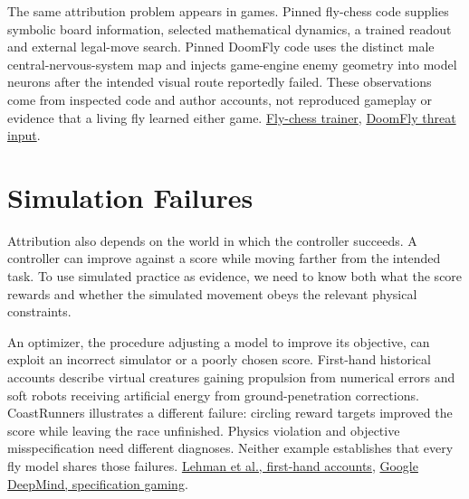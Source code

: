 The same attribution problem appears in games. Pinned fly-chess code supplies symbolic board information, selected mathematical dynamics, a trained readout and external legal-move search. Pinned DoomFly code uses the distinct male central-nervous-system map and injects game-engine enemy geometry into model neurons after the intended visual route reportedly failed. These observations come from inspected code and author accounts, not reproduced gameplay or evidence that a living fly learned either game. \href{https://github.com/mncrftfrcnm/making-fly-play-chess/blob/b97dfefbf9b8850f3cdf6b412c2ed840be94e260/scripts/fly_chess_trainer.py}{Fly-chess trainer}, \href{https://github.com/shreyash-sharma/doomFly/blob/5f6c2881be5f5f40b0592a75e6ee231b50333b40/src/doom/fearless/danger.py}{DoomFly threat input}.\par

\section{Simulation Failures}

Attribution also depends on the world in which the controller succeeds. A
controller can improve against a score while moving farther from the intended
task. To use simulated practice as evidence, we need to know both what the
score rewards and whether the simulated movement obeys the relevant
physical constraints.\par

An optimizer, the procedure adjusting a model to improve its objective, can exploit an incorrect simulator or a poorly chosen score. First-hand historical accounts describe virtual creatures gaining propulsion from numerical errors and soft robots receiving artificial energy from ground-penetration corrections. CoastRunners illustrates a different failure: circling reward targets improved the score while leaving the race unfinished. Physics violation and objective misspecification need different diagnoses. Neither example establishes that every fly model shares those failures. \href{https://arxiv.org/html/1803.03453v4}{Lehman et al., first-hand accounts}, \href{https://deepmind.google/blog/specification-gaming-the-flip-side-of-ai-ingenuity/}{Google DeepMind, specification gaming}.\par

